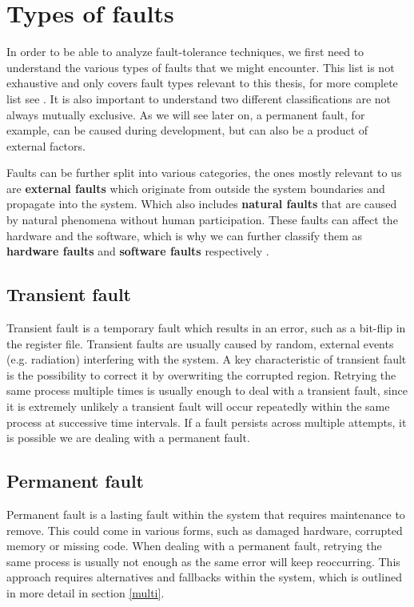 \section{Types of faults}

In order to be able to analyze fault-tolerance techniques, we first need to understand the various types of faults that we might encounter. This list is not exhaustive and only covers fault types relevant to this thesis, for more complete list see \cite{1335465}. It is also important to understand two different classifications are not always mutually exclusive. As we will see later on, a permanent fault, for example, can be caused during development, but can also be a product of external factors.

Faults can be further split into various categories, the ones mostly relevant to us are \textbf{external faults} which originate from outside the system boundaries and propagate into the system. Which also includes \textbf{natural faults} that are caused by natural phenomena without human participation. These faults can affect the hardware and the software, which is why we can further classify them as \textbf{hardware faults} and \textbf{software faults} respectively \cite{1335465}. \\

\subsection{Transient fault} 
Transient fault is a temporary fault which results in an error, such as a bit-flip in the register file. Transient faults are usually caused by random, external events (e.g. radiation) interfering with the system. A key characteristic of transient fault is the possibility to correct it by overwriting the corrupted region. Retrying the same process multiple times is usually enough to deal with a transient fault, since it is extremely unlikely a transient fault will occur repeatedly within the same process at successive time intervals. If a fault persists across multiple attempts, it is possible we are dealing with a permanent fault. \\

\subsection{Permanent fault} 
Permanent fault is a lasting fault within the system that requires maintenance to remove. This could come in various forms, such as damaged hardware, corrupted memory or missing code. When dealing with a permanent fault, retrying the same process is usually not enough as the same error will keep reoccurring. This approach requires alternatives and fallbacks within the system, which is outlined in more detail in section \ref{multi}. \\

